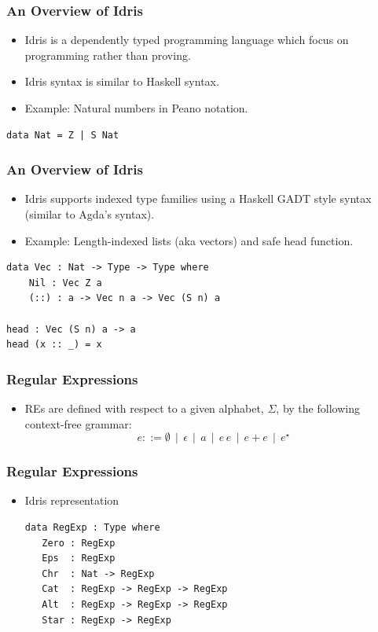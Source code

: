 \documentclass[14pt]{beamer}
\begin{document}
     \begin{frame}[fragile=singleslide]
        \frametitle{An Overview of Idris}
            \begin{itemize}
               \item Idris is a dependently typed programming language which focus
                     on programming rather than proving.
               \item Idris syntax is similar to Haskell syntax.
               \item Example: Natural numbers in Peano notation.
            \end{itemize}
            \begin{verbatim}
data Nat = Z | S Nat
            \end{verbatim}
     \end{frame}
     \begin{frame}[fragile=singleslide]
        \frametitle{An Overview of Idris}
            \begin{itemize}
               \item Idris supports indexed type families using a Haskell GADT
                     style syntax (similar to Agda's syntax).
               \item Example: Length-indexed lists (aka vectors) and safe head
                     function.
            \end{itemize}
            \begin{verbatim}
data Vec : Nat -> Type -> Type where
    Nil : Vec Z a
    (::) : a -> Vec n a -> Vec (S n) a

head : Vec (S n) a -> a
head (x :: _) = x
            \end{verbatim}
     \end{frame}
     \begin{frame}[fragile=singleslide]
        \frametitle{Regular Expressions}
        \begin{itemize}
           \item REs are defined with respect to a given alphabet, $\Sigma$, by
           the following context-free grammar:
           \[
           e ::= \emptyset\,\mid\,\epsilon\,\mid\,a\,\mid\,e\,e\,\mid\,e+e\,\mid\,e^{\star}
           \]
        \end{itemize}
     \end{frame}
     \begin{frame}[fragile=singleslide]
        \frametitle{Regular Expressions}
           \begin{itemize}
           \item Idris representation
           \begin{verbatim}
data RegExp : Type where
   Zero : RegExp
   Eps  : RegExp
   Chr  : Nat -> RegExp
   Cat  : RegExp -> RegExp -> RegExp
   Alt  : RegExp -> RegExp -> RegExp
   Star : RegExp -> RegExp
           \end{verbatim}
        \end{itemize}
     \end{frame}
\end{document}
